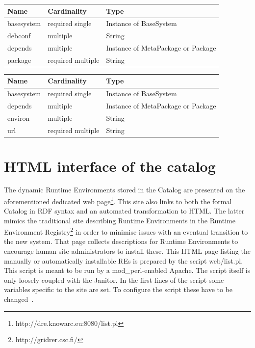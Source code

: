 \begin{table}[!h]
   \begin{center}
         \label{tab:main_class_debian}
	\begin{tabular}{p{3cm}p{3cm}p{6cm}}
	\textbf{Name}  & \textbf{Cardinality}  & \textbf{Type}\\
	\hline
	basesystem     & required single       & Instance of BaseSystem       \\
	debconf        & multiple              & String       \\
	depends        & multiple              & Instance of MetaPackage  or Package      \\
	package        & required multiple              & String      \\
	\end{tabular} 
   \end{center}
\end{table}

\begin{table}[!h]
   \begin{center}
         \label{tab:main_class_tar}
	\begin{tabular}{p{3cm}p{3cm}p{6cm}}
	\textbf{Name}  & \textbf{Cardinality}  & \textbf{Type}\\
	\hline
	basesystem     & required single       & Instance of BaseSystem       \\
	depends        & multiple              & Instance of MetaPackage or Package      \\
	environ        & multiple              & String       \\
	url            & required multiple     & String      \\
	\end{tabular} 
   \end{center}
\end{table}

\section{HTML interface of the catalog}

The dynamic Runtime Environments stored in the Catalog are presented on the aforementioned dedicated web
page\footnote{http://dre.knowarc.eu:8080/list.pl}. This site also links to both the formal Catalog in 
RDF syntax and an automated transformation to
HTML. The latter mimics the traditional site describing Runtime Environments in the Runtime Environment
Registry\footnote{http://gridrer.csc.fi/} in order to minimise issues with an eventual transition to the new system. 
That page collects descriptions for Runtime Environments to encourage human site administrators to install these.
This HTML page listing the manually or automatically installable REs is prepared by the script web/list.pl.
This script is meant to be run by a mod\_perl-enabled Apache. The script itself is only loosely coupled
with the Janitor. In the first lines of the script some variables specific to the site are set. To configure the
script these have to be changed~\cite[p. 9]{BAYER_2007}.



